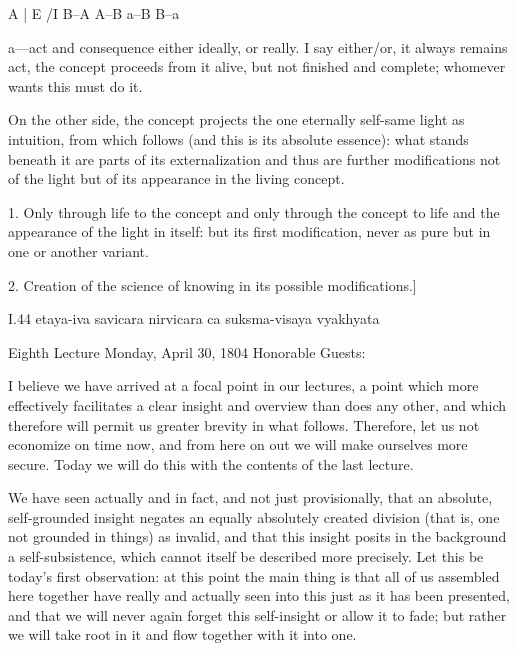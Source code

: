 A | E /I B–A A–B \R a–B B–a

a—act and consequence either ideally, or really.
I say either/or, it always remains act,
the concept proceeds from it alive,
but not finished and complete;
whomever wants this must do it.

On the other side, the concept projects
the one eternally self-same light as intuition,
from which follows (and this is its absolute essence):
what stands beneath it are parts of its externalization
and thus are further modifications not of the light
but of its appearance in the living concept.

1. Only through life to the concept
and only through the concept to life
and the appearance of the light in itself:
but its first modification, never as pure
but in one or another variant.

2. Creation of the science of knowing
in its possible modifications.]

I.44
etaya-iva savicara nirvicara ca suksma-visaya vyakhyata

Eighth Lecture
Monday, April 30, 1804
Honorable Guests:

I believe we have arrived at a focal point in our lectures,
a point which more effectively facilitates
a clear insight and overview than does any other,
and which therefore will permit us greater brevity in what follows.
Therefore, let us not economize on time now,
and from here on out we will make ourselves more secure.
Today we will do this with the contents of the last lecture.

We have seen actually and in fact,
and not just provisionally,
that an absolute, self-grounded insight negates
an equally absolutely created division
(that is, one not grounded in things)
as invalid, and that this insight posits
in the background a self-subsistence,
which cannot itself be described more precisely.
Let this be today’s first observation:
at this point the main thing is that
all of us assembled here together have
really and actually seen into this
just as it has been presented,
and that we will never again forget this
self-insight or allow it to fade;
but rather we will take root in it
and flow together with it into one.

